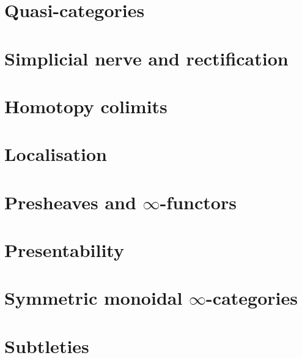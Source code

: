 \documentclass{article}
\numberwithin{equation}{subsection}
\begin{document}
    \section{Quasi-categories}

    \section{Simplicial nerve and rectification}

    \section{Homotopy colimits}

    \section{Localisation}

    \section{Presheaves and $\infty$-functors}

    \section{Presentability}

    \section{Symmetric monoidal $\infty$-categories}

    \section{Subtleties}
\end{document}
